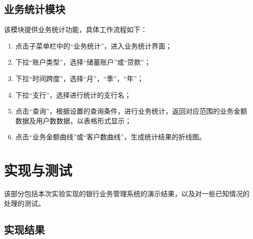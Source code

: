 \documentclass{ctexart}
\begin{document}
\subsection{\hei 业务统计模块}
该模块提供业务统计功能，具体工作流程如下：
\begin{enumerate}
    \item 点击子菜单栏中的“业务统计”，进入业务统计界面；
    \item 下拉“账户类型”，选择“储蓄账户”或“贷款”；
    \item 下拉“时间跨度”，选择“月”，“季”，“年”；
    \item 下拉“支行”，选择进行统计的支行名；
    \item 点击“查询”，根据设置的查询条件，进行业务统计，返回对应范围的业务金额数据及用户数数据，以表格形式显示；
    \item 点击“业务金额曲线”或“客户数曲线”，生成统计结果的折线图。
\end{enumerate}
\section{\hei 实现与测试}
该部分包括本次实验实现的银行业务管理系统的演示结果，以及对一些已知情况的处理的测试。
\subsection{\hei 实现结果}
\end{document}
